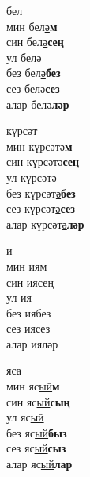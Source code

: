 \begin{multicols}{4}
\begin{enumerate}
\begin{minipage}{\linewidth}
    \item
    бел\\
    мин бел\underline{ә}\textbf{м}\\
    син бел\underline{ә}\textbf{сең}\\
    ул бел\underline{ә}\\
    без бел\underline{ә}\textbf{без}\\
    сез бел\underline{ә}\textbf{сез}\\
    алар бел\underline{ә}\textbf{ләр}\\
\end{minipage}

\begin{minipage}{\linewidth}
    \item
    күрсәт\\
    мин күрсәт\underline{ә}\textbf{м}\\
    син күрсәт\underline{ә}\textbf{сең}\\
    ул күрсәт\underline{ә}\\
    без күрсәт\underline{ә}\textbf{без}\\
    сез күрсәт\underline{ә}\textbf{сез}\\
    алар күрсәт\underline{ә}\textbf{ләр}\\
\end{minipage}

\begin{minipage}{\linewidth}
    \item
    и\\
    мин иям\\
    син иясең\\
    ул ия\\
    без иябез\\
    сез иясез\\
    алар ияләр\\
\end{minipage}

\begin{minipage}{\linewidth}
    \item
    яса\\
    мин яс\underline{ый}\textbf{м}\\
    син яс\underline{ый}\textbf{сың}\\
    ул яс\underline{ый}\\
    без яс\underline{ый}\textbf{быз}\\
    сез яс\underline{ый}\textbf{сыз}\\
    алар яс\underline{ый}\textbf{лар}\\
\end{minipage}


\end{enumerate}
\end{multicols}
